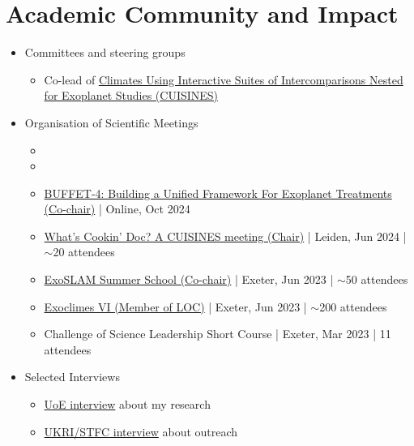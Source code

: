 \documentclass[a4paper, 11pt]{article}
\begin{document}
\section{Academic Community and Impact}
\begin{itemize}[nosep, leftmargin=10pt]
    \item Committees and steering groups
    \begin{itemize}
        \item Co-lead of \href{https://nexss.info/cuisines}{Climates Using Interactive Suites of Intercomparisons Nested for Exoplanet Studies (CUISINES)}
    \end{itemize}
    \item Organisation of Scientific Meetings
    \begin{itemize}
        \item {}
        \item {}
        \item \href{https://nexss.info/buffet-4-in-october-22nd-and-23rd-2024/}{BUFFET-4: Building a Unified Framework For Exoplanet Treatments (Co-chair)} | Online, Oct 2024
        \item \href{https://exoplanets5.org/splintersessions/}{What's Cookin' Doc? A CUISINES meeting (Chair)} | Leiden, Jun 2024 | $\sim$20 attendees
        \item \href{https://exoclim.github.ioexoclimes2023/exoslam/index.html}{ExoSLAM Summer School (Co-chair)} | Exeter, Jun 2023 | $\sim$50 attendees
        \item \href{https://exoclim.github.ioexoclimes2023}{Exoclimes VI (Member of LOC)} | Exeter, Jun 2023 | $\sim$200 attendees
        \item Challenge of Science Leadership Short Course | Exeter, Mar 2023 | 11 attendees
    \end{itemize}
    \item Selected Interviews
    \begin{itemize}
        \item \href{https://youtu.be/_Aus842EZWk}{UoE interview} about my research
        \item \href{https://youtu.be/PzQSfCwp0B8}{UKRI/STFC interview} about outreach
    \end{itemize}
\end{itemize}
\end{document}

